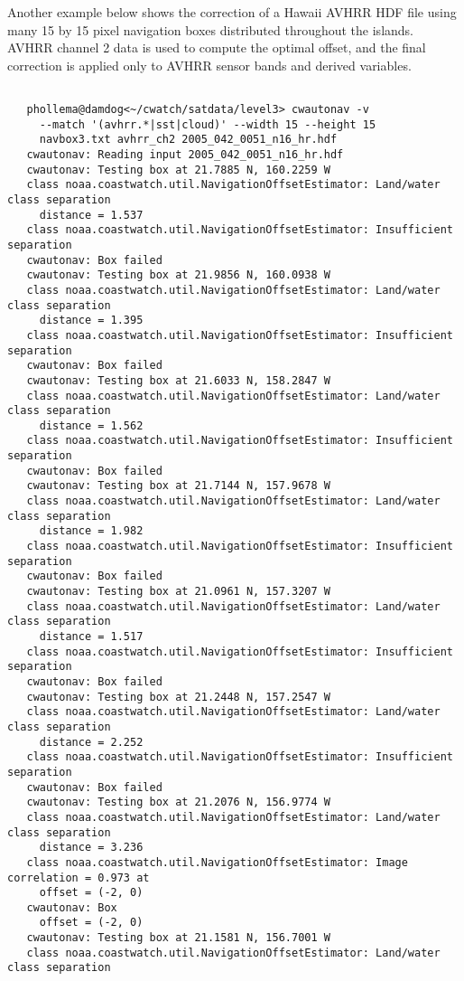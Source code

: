  Another example below shows the correction of a Hawaii AVHRR HDF file using many 15 by 15 pixel navigation boxes distributed throughout the islands. AVHRR channel 2 data is used to compute the optimal offset, and the final correction is applied only to AVHRR sensor bands and derived variables. \begin{verbatim}

   phollema@damdog<~/cwatch/satdata/level3> cwautonav -v 
     --match '(avhrr.*|sst|cloud)' --width 15 --height 15 
     navbox3.txt avhrr_ch2 2005_042_0051_n16_hr.hdf
   cwautonav: Reading input 2005_042_0051_n16_hr.hdf
   cwautonav: Testing box at 21.7885 N, 160.2259 W
   class noaa.coastwatch.util.NavigationOffsetEstimator: Land/water class separation 
     distance = 1.537
   class noaa.coastwatch.util.NavigationOffsetEstimator: Insufficient separation
   cwautonav: Box failed
   cwautonav: Testing box at 21.9856 N, 160.0938 W
   class noaa.coastwatch.util.NavigationOffsetEstimator: Land/water class separation 
     distance = 1.395
   class noaa.coastwatch.util.NavigationOffsetEstimator: Insufficient separation
   cwautonav: Box failed
   cwautonav: Testing box at 21.6033 N, 158.2847 W
   class noaa.coastwatch.util.NavigationOffsetEstimator: Land/water class separation 
     distance = 1.562
   class noaa.coastwatch.util.NavigationOffsetEstimator: Insufficient separation
   cwautonav: Box failed
   cwautonav: Testing box at 21.7144 N, 157.9678 W
   class noaa.coastwatch.util.NavigationOffsetEstimator: Land/water class separation 
     distance = 1.982
   class noaa.coastwatch.util.NavigationOffsetEstimator: Insufficient separation
   cwautonav: Box failed
   cwautonav: Testing box at 21.0961 N, 157.3207 W
   class noaa.coastwatch.util.NavigationOffsetEstimator: Land/water class separation 
     distance = 1.517
   class noaa.coastwatch.util.NavigationOffsetEstimator: Insufficient separation
   cwautonav: Box failed
   cwautonav: Testing box at 21.2448 N, 157.2547 W
   class noaa.coastwatch.util.NavigationOffsetEstimator: Land/water class separation 
     distance = 2.252
   class noaa.coastwatch.util.NavigationOffsetEstimator: Insufficient separation
   cwautonav: Box failed
   cwautonav: Testing box at 21.2076 N, 156.9774 W
   class noaa.coastwatch.util.NavigationOffsetEstimator: Land/water class separation 
     distance = 3.236
   class noaa.coastwatch.util.NavigationOffsetEstimator: Image correlation = 0.973 at 
     offset = (-2, 0)
   cwautonav: Box 
     offset = (-2, 0)
   cwautonav: Testing box at 21.1581 N, 156.7001 W
   class noaa.coastwatch.util.NavigationOffsetEstimator: Land/water class separation 

\end{verbatim}

